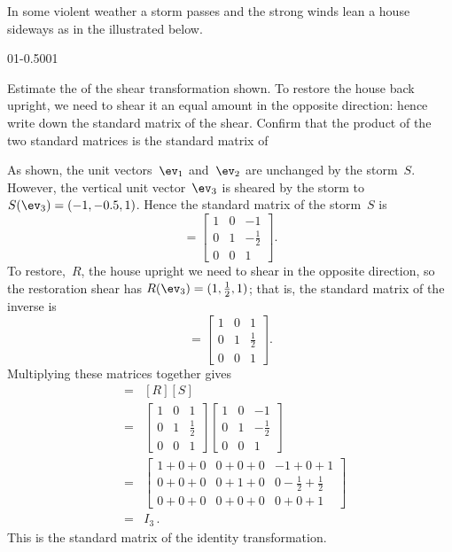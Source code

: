 \begin{example} \label{eg:stormLT}
In some violent weather a storm passes and the strong winds lean a house sideways as in the  illustrated below.
\begin{center}\def\unithousesize{small}
01{-0.5}001
\end{center}
Estimate the  of the shear transformation shown.
To restore the house back upright, we need to shear it an equal amount in the opposite direction: hence write down the standard matrix of the  shear.
Confirm that the product of the two standard matrices is the standard matrix of 
\begin{solution} 
As shown, the unit vectors~\(\ev_1\) and~\(\ev_2\) are unchanged by the storm~\(S\).  
However, the vertical unit vector~\(\ev_3\) is sheared by the storm to \(S(\ev_3)=(-1,-0.5,1)\).
Hence the standard matrix of the storm~\(S\) is
\begin{equation*}
[S]=\begin{bmatrix} 1&0&-1\\0&1&-\tfrac12\\0&0&1 \end{bmatrix}.
\end{equation*}
To restore,~\(R\), the house upright we need to shear in the opposite direction, so the restoration shear has \(R(\ev_3)=(1,\tfrac12,1)\); that is, the standard matrix of the inverse is
\begin{equation*}
[R]=\begin{bmatrix} 1&0&1\\0&1&\tfrac12\\0&0&1 \end{bmatrix}.
\end{equation*}
Multiplying these matrices together gives
\begin{eqnarray*}
[R\circ S]&=&[R][S]
\\&=&\begin{bmatrix} 1&0&1\\0&1&\tfrac12\\0&0&1 \end{bmatrix}
\begin{bmatrix} 1&0&-1\\0&1&-\tfrac12\\0&0&1 \end{bmatrix}
\\&=&\begin{bmatrix} 1+0+0&0+0+0&-1+0+1\\
0+0+0&0+1+0&0-\tfrac12+\tfrac12\\
0+0+0&0+0+0&0+0+1 \end{bmatrix}
\\&=&I_3\,.
\end{eqnarray*}
This is the standard matrix of the identity transformation.
\end{solution}
\end{example}


